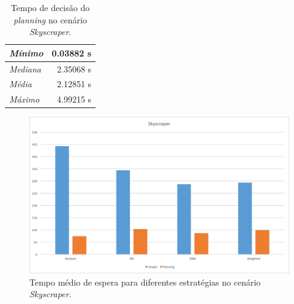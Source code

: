 \begin{table}[htb]
\centering
\caption{Tempo de decisão do \textit{planning} no cenário \textit{Skyscraper}.}
\label{table:results:skyscraper:time}
\begin{tabular}{|l|r|}
\hline
\textit{Mínimo}  & 0.03882 s \\ \hline
\textit{Mediana} & 2.35068 s \\ \hline
\textit{Média}   & 2.12851 s \\ \hline
\textit{Máximo}  & 4.99215 s \\ \hline
\end{tabular}
\end{table}

\begin{figure}[htb]
  \centering
  \includegraphics[scale=0.5]{img/chart-averages-skyscraper}
  \caption[{Tempo médio de espera no cenário \textit{Skyscraper}.}]{Tempo médio de espera para diferentes estratégias no cenário \textit{Skyscraper}.}
  \label{fig:result:average:skyscraper}
\end{figure}
